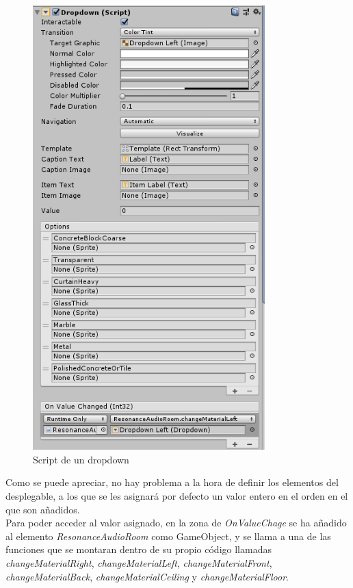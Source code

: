 \begin{figure}[htb]
	\centering
	\includegraphics[width=0.8\textwidth]{./imagenes/dropDownScriptUnity}
	\caption{Script de un dropdown}
\end{figure}

\quad Como se puede apreciar, no hay problema a la hora de definir los elementos del desplegable, a los que se les asignará por defecto un valor entero en el orden en el que son añadidos.\\

\quad Para poder acceder al valor asignado, en la zona de \textit{OnValueChage} se ha añadido al elemento \textit{ResonanceAudioRoom} como GameObject, y se llama a una de las funciones que se montaran dentro de su propio código llamadas \textit{changeMaterialRight}, \textit{changeMaterialLeft}, \textit{changeMaterialFront}, \textit{changeMaterialBack}, \textit{changeMaterialCeiling} y \textit{changeMaterialFloor}.\\

